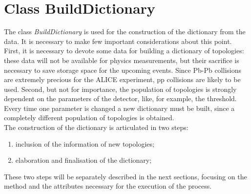 \section{Class BuildDictionary}
The class \textit{BuildDictionary} is used for the construction of the dictionary from the data. It is necessary to make few important considerations about this point. First, it is necessary to devote some data for building a dictionary of topologies: these data will not be available for physics measurements, but their sacrifice is necessary to save storage space for the upcoming events. Since Pb-Pb collisions are extremely precious for the ALICE experiment, pp collisions are likely to be used. Second, but not for importance, the population of topologies is strongly dependent on the parameters of the detector, like, for example, the threshold. Every time one parameter is changed a new dictionary must be built, since a completely different population of topologies is obtained.\\
The construction of the dictionary is articulated in two steps:
\begin{enumerate}
 \item inclusion of the information of new topologies;
 \item elaboration and finalisation of the dictionary;
\end{enumerate}
These two steps will be separately described in the next sections, focusing on the method and the attributes necessary for the execution of the process.
